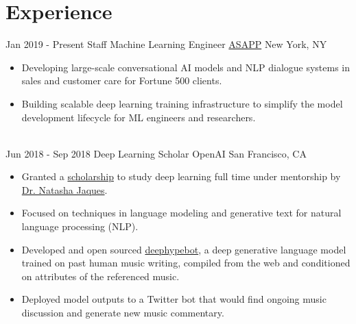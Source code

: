 \documentclass[letterpaper]{twentysecondcv} %
\begin{document}
\makeprofile %


\section{Experience}

\begin{twenty} %
    \twentyitem
    	{Jan 2019 -}
		{Present}
        {Staff Machine Learning Engineer}
        {\href{https://www.asapp.com/}{ASAPP}}
        {New York, NY}
        {
        {\begin{itemize} \itemsep 2pt %
        \item Developing large-scale conversational AI models and NLP dialogue systems in sales and customer care for Fortune 500 clients.
        \item Building scalable deep learning training infrastructure to simplify the model development lifecycle for ML engineers and researchers.
        \end{itemize}}
        }
    \\
    \twentyitem
    	{Jun 2018 -}
		{Sep 2018}
        {Deep Learning Scholar}
        {OpenAI}
        {San Francisco, CA}
        {
        {\begin{itemize} \itemsep 2pt %
        \item Granted a \href{https://blog.openai.com/openai-scholars/}{scholarship} to study deep learning full time under mentorship by \href{https://natashajaques.ai/}{Dr. Natasha Jaques}.
        \item Focused on techniques in language modeling and generative text for natural language processing (NLP).
        \item Developed and open sourced \href{https://github.com/iconix/deephypebot}{deephypebot}, a deep generative language model trained on past human music writing, compiled from the web and conditioned on attributes of the referenced music.
        \item Deployed model outputs to a Twitter bot that would find ongoing music discussion and generate new music commentary.
        \end{itemize}}
        }
    \\
    \twentyitem

\end{twenty}
\end{document}
